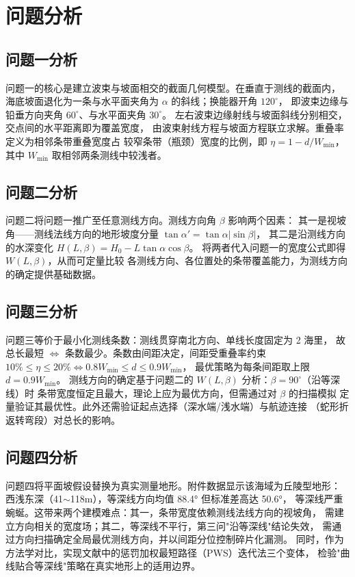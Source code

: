 \documentclass[withoutpreface,bwprint]{cumcmthesis} %
\begin{document}
\section{问题分析}

\subsection{问题一分析}
问题一的核心是建立波束与坡面相交的截面几何模型。在垂直于测线的截面内，
海底坡面退化为一条与水平面夹角为 $\alpha$ 的斜线；换能器开角 $120^\circ$，
即波束边缘与铅垂方向夹角 $60^\circ$、与水平面夹角 $30^\circ$。
左右波束边缘射线与坡面斜线分别相交，交点间的水平距离即为覆盖宽度，
由波束射线方程与坡面方程联立求解。重叠率定义为相邻条带重叠宽度占
较窄条带（瓶颈）宽度的比例，即 $\eta=1-d/W_{\min}$，其中 $W_{\min}$ 取相邻两条测线中较浅者。

\subsection{问题二分析}
问题二将问题一推广至任意测线方向。测线方向角 $\beta$ 影响两个因素：
其一是视坡角——测线法线方向的地形坡度分量 $\tan\alpha'=\tan\alpha|\sin\beta|$，
其二是沿测线方向的水深变化 $H(L,\beta)=H_0-L\tan\alpha\cos\beta$。
将两者代入问题一的宽度公式即得 $W(L,\beta)$，从而可定量比较
各测线方向、各位置处的条带覆盖能力，为测线方向的确定提供基础数据。

\subsection{问题三分析}
问题三等价于最小化测线条数：测线贯穿南北方向、单线长度固定为 2 海里，
故总长最短 $\Leftrightarrow$ 条数最少。条数由间距决定，间距受重叠率约束
$10\%\le\eta\le20\%\Leftrightarrow 0.8W_{\min}\le d\le0.9W_{\min}$，
最优策略为每条间距取上限 $d=0.9W_{\min}$。
测线方向的确定基于问题二的 $W(L,\beta)$ 分析：$\beta=90^\circ$（沿等深线）时
条带宽度恒定且最大，理论上应为最优方向，但需通过对 $\beta$ 的扫描模拟
定量验证其最优性。此外还需验证起点选择（深水端/浅水端）与航迹连接
（蛇形折返转弯段）对总长的影响。

\subsection{问题四分析}
问题四将平面坡假设替换为真实测量地形。附件数据显示该海域为丘陵型地形：
西浅东深（41$\sim$118m），等深线方向均值 88.4° 但标准差高达 50.6°，
等深线严重蜿蜒。这带来两个建模难点：其一，条带宽度依赖测线法线方向的视坡角，
需建立方向相关的宽度场；其二，等深线不平行，第三问"沿等深线"结论失效，
需通过方向扫描确定全局最优测线方向，并以间距分位控制碎片化漏测。
同时，作为方法学对比，实现文献中的惩罚加权最短路径（PWS）迭代法三个变体，
检验"曲线贴合等深线"策略在真实地形上的适用边界。
\end{document}
